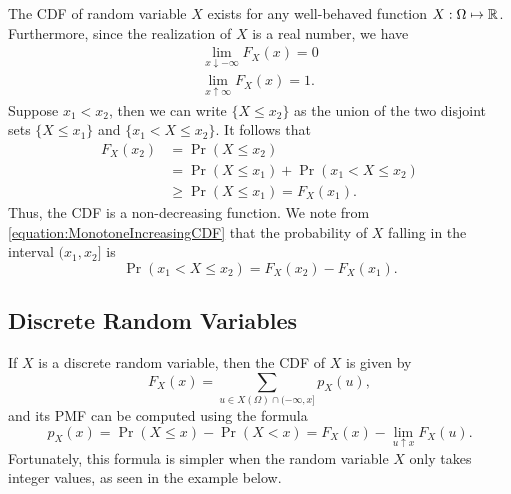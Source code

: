 The CDF of random variable $X$ exists for any well-behaved function $X : \Omega \mapsto \mathbb{R}$.
Furthermore, since the realization of $X$ is a real number, we have
\begin{gather*}
\lim_{x \downarrow - \infty} F_X (x) = 0 \\
\lim_{x \uparrow \infty} F_X (x) = 1.
\end{gather*}
Suppose $x_1 < x_2$, then we can write $\{ X \leq x_2 \}$ as the union of the two disjoint sets $\{ X \leq x_1 \}$ and $\{ x_1 < X \leq x_2 \}$.
It follows that
\begin{equation} \label{equation:MonotoneIncreasingCDF}
\begin{split}
F_X (x_2) &= \Pr (X \leq x_2) \\
&= \Pr (X \leq x_1) + \Pr (x_1 < X \leq x_2) \\
&\geq \Pr (X \leq x_1) = F_X (x_1).
\end{split}
\end{equation}
Thus, the CDF is a non-decreasing function.
We note from \eqref{equation:MonotoneIncreasingCDF} that the probability of $X$ falling in the interval $(x_1, x_2]$ is
\begin{equation} \label{equation:IntervalCDF}
\Pr (x_1 < X \leq x_2) = F_X (x_2) - F_X (x_1).
\end{equation}


\subsection{Discrete Random Variables}

If $X$ is a discrete random variable, then the CDF of $X$ is given by
\begin{equation*}
F_X (x) = \sum_{u \in X(\Omega) \cap (-\infty, x]} p_X (u),
\end{equation*}
and its PMF can be computed using the formula
\begin{equation*}
p_X (x) = \Pr (X \leq x) - \Pr (X < x) = F_X (x) - \lim_{u \uparrow x} F_X (u).
\end{equation*}
Fortunately, this formula is simpler when the random variable $X$ only takes integer values, as seen in the example below.

